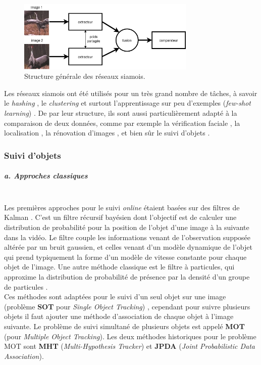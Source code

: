 \documentclass[10pt,twocolumn,letterpaper,french]{article}
\begin{document}
\begin{figure}[!h]
\centering
\includegraphics[width=240pt]{images/siamese.png} 
\caption{Structure générale des réseaux siamois.}
\label{siamese}
\end{figure}

Les réseaux siamois ont été utilisés pour un très grand nombre de tâches, à savoir le \textit{hashing} \cite{hashing}, le \textit{clustering} \cite{clustering} et surtout l'apprentissage sur peu d'exemples (\textit{few-shot learning}) \cite{one-shot}. De par leur structure, ils sont aussi particulièrement adapté à la comparaison de deux données, comme par exemple la vérification faciale \cite{face_verif}, la localisation \cite{tompson2015efficient}, la rénovation d'images \cite{gordo2017endtoend}, et bien sûr le suivi d'objets \cite{siamfc, siamfcplusplus, siamMask, trackRCNN}.

\subsubsection*{Suivi d'objets}

\subparagraph{a. Approches classiques\\\\} 

Les premières approches pour le suivi \textit{online} étaient basées sur des filtres de Kalman \cite{Kalman}. C'est un filtre récursif bayésien dont l'objectif est de calculer une distribution de probabilité pour la position de l'objet d'une image à la suivante dans la vidéo. Le filtre couple les informations venant de l'observation supposée altérée par un bruit gaussien, et celles venant d'un modèle dynamique de l'objet qui prend typiquement la forme d'un modèle de vitesse constante pour chaque objet de l'image. Une autre méthode classique est le filtre à particules, qui approxime la distribution de probabilité de présence par la densité d'un groupe de particules \cite{particule}. \\

Ces méthodes sont adaptées pour le suivi d'un seul objet sur une image (problème \textbf{SOT} pour \textit{Single Object Tracking}) , cependant pour suivre plusieurs objets il faut ajouter une méthode d'association de chaque objet à l'image suivante. Le problème de suivi simultané de plusieurs objets est appelé \textbf{MOT} (pour \textit{Multiple Object Tracking}). Les deux méthodes historiques pour le problème MOT sont \textbf{MHT} (\textit{Multi-Hypothesis Tracker}) et \textbf{JPDA} (\textit{Joint Probabilistic Data Association}).
\end{document}
